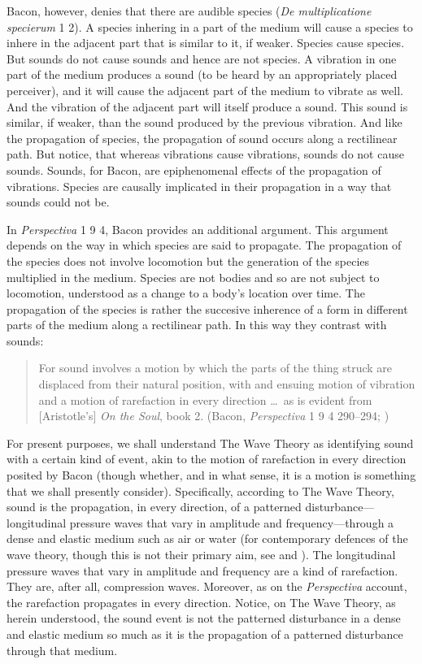 Bacon, however, denies that there are audible species (\emph{De multiplicatione specierum} 1 2). A species inhering in a part of the medium will cause a species to inhere in the adjacent part that is similar to it, if weaker. Species cause species. But sounds do not cause sounds and hence are not species. A vibration in one part of the medium produces a sound (to be heard by an appropriately placed perceiver), and it will cause the adjacent part of the medium to vibrate as well. And the vibration of the adjacent part will itself produce a sound. This sound is similar, if weaker, than the sound produced by the previous vibration. And like the propagation of species, the propagation of sound occurs along a rectilinear path. But notice, that whereas vibrations cause vibrations, sounds do not cause sounds. Sounds, for Bacon, are epiphenomenal effects of the propagation of vibrations. Species are causally implicated in their propagation in a way that sounds could not be.

In \emph{Perspectiva} 1 9 4, Bacon provides an additional argument. This argument depends on the way in which species are said to propagate. The propagation of the species does not involve locomotion but the generation of the species multiplied in the medium. Species are not bodies and so are not subject to locomotion, understood as a change to a body's location over time. The propagation of the species is rather the succesive inherence of a form in different parts of the medium along a rectilinear path. In this way they contrast with sounds:
\begin{quote}
	For sound involves a motion by which the parts of the thing struck are displaced from their natural position, with and ensuing motion of vibration and a motion of rarefaction in every direction \ldots\ as is evident from [Aristotle's] \emph{On the Soul}, book 2. (Bacon, \emph{Perspectiva} 1 9 4 290--294; \citealt[143]{Lindberg:1996bk})
\end{quote}

For present purposes, we shall understand The Wave Theory as identifying sound with a certain kind of event, akin to the motion of rarefaction in every direction posited by Bacon (though whether, and in what sense, it is a motion is something that we shall presently consider). Specifically, according to The Wave Theory, sound is the propagation, in every direction, of a patterned disturbance---longitudinal pressure waves that vary in amplitude and frequency---through a dense and elastic medium such as air or water (for contemporary defences of the wave theory, though this is not their primary aim, see \citealt{OShaughnessy:2009aa} and \citealt{Sorensen:2009aa}). The longitudinal pressure waves that vary in amplitude and frequency are a kind of rarefaction. They are, after all, compression waves. Moreover, as on the \emph{Perspectiva} account, the rarefaction propagates in every direction. Notice, on The Wave Theory, as herein understood, the sound event is not the patterned disturbance in a dense and elastic medium so much as it is the propagation of a patterned disturbance through that medium. 

